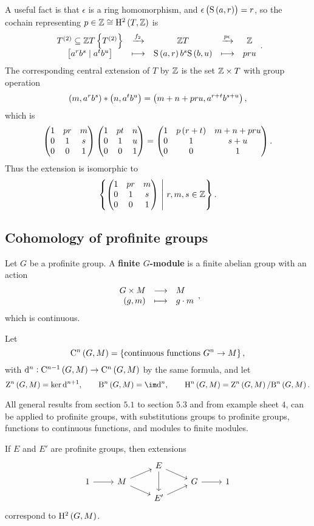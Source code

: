 A useful fact is that $ \epsilon $ is a ring homomorphism, and $ \epsilon\br{\S\br{a, r}} = r $, so the cochain representing $ p \in \ZZ \cong \H^2\br{T, \ZZ} $ is
$$
\begin{array}{ccccc}
T^{\br{2}} \subseteq \ZZ T\cbr{T^{\br{2}}} & \xrightarrow{f_2} & \ZZ T & \xrightarrow{p\epsilon} & \ZZ \\
\sbr{a^rb^s \mid a^tb^u} & \longmapsto & \S\br{a, r}b^s\S\br{b, u} & \longmapsto & pru
\end{array}.
$$
The corresponding central extension of $ T $ by $ \mathbb{Z} $ is the set $ \mathbb{Z} \times T $ with group operation
$$ \br{m, a^rb^s} * \br{n, a^tb^u} = \br{m + n + pru, a^{r + t}b^{s + u}}, $$
which is
$$ \threebythree{1}{pr}{m}{0}{1}{s}{0}{0}{1}\threebythree{1}{pt}{n}{0}{1}{u}{0}{0}{1} = \threebythree{1}{p\br{r + t}}{m + n + pru}{0}{1}{s + u}{0}{0}{1}. $$
Thus the extension is isomorphic to
$$ \cbr{\threebythree{1}{pr}{m}{0}{1}{s}{0}{0}{1} \st r, m, s \in \ZZ}. $$

\pagebreak

\subsection{Cohomology of profinite groups}

\begin{definition}
Let $ G $ be a profinite group. A \textbf{finite $ G $-module} is a finite abelian group with an action
$$ \function{G \times M}{M}{\br{g, m}}{g \cdot m}, $$
which is continuous.
\end{definition}

\begin{definition}
Let
$$ \C^n\br{G, M} = \cbr{\text{continuous functions} \ G^n \to M}, $$
with $ \d^n : \C^{n - 1}\br{G, M} \to \C^n\br{G, M} $ by the same formula, and let
$$ \Z^n\br{G, M} = \ker \d^{n + 1}, \qquad \B^n\br{G, M} = \im \d^n, \qquad \H^n\br{G, M} = \Z^n\br{G, M} / \B^n\br{G, M}. $$
\end{definition}

\begin{theorem}
All general results from section $ 5.1 $ to section $ 5.3 $ and from example sheet $ 4 $, can be applied to profinite groups, with substitutions groups to profinite groups, functions to continuous functions, and modules to finite modules.
\end{theorem}

If $ E $ and $ E' $ are profinite groups, then extensions
$$
\begin{tikzcd}[row sep=tiny]
& & E \arrow{dr} \arrow{dd} & & \\
1 \arrow{r} & M \arrow{ur} \arrow{dr} & & G \arrow{r} & 1 \\
& & E' \arrow{ur} & &
\end{tikzcd}
$$
correspond to $ \H^2\br{G, M} $.

